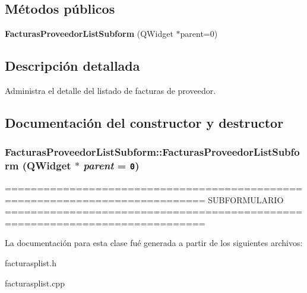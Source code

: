 \subsection*{M\'{e}todos p\'{u}blicos}
\begin{CompactItemize}
\item 
{\bf Facturas\-Proveedor\-List\-Subform} (QWidget $\ast$parent=0)
\end{CompactItemize}


\subsection{Descripci\'{o}n detallada}
Administra el detalle del listado de facturas de proveedor. 



\subsection{Documentaci\'{o}n del constructor y destructor}
\subsubsection{\setlength{\rightskip}{0pt plus 5cm}Facturas\-Proveedor\-List\-Subform::Facturas\-Proveedor\-List\-Subform (QWidget $\ast$ {\em parent} = {\tt 0})}\label{classFacturasProveedorListSubform_a0}


============================================================================= SUBFORMULARIO ============================================================================= 

La documentaci\'{o}n para esta clase fu\'{e} generada a partir de los siguientes archivos:\begin{CompactItemize}
\item 
facturasplist.h\item 
facturasplist.cpp\end{CompactItemize}
